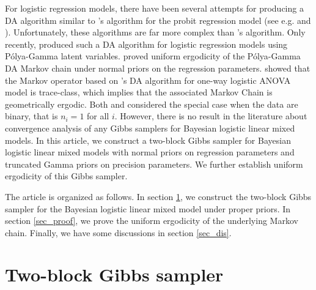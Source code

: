 \documentclass[11pt,a4paper]{article}
\newcommand{\pcite}[1]{\citeauthor{#1}'s \citeyearpar{#1}}
\begin{document}
For logistic regression models, there have been several attempts for producing a DA algorithm similar to \pcite{albert1993bayesian} algorithm for the probit regression model (see e.g. \cite{holmes2006bayesian} and \cite{fruhwirth2010data}). Unfortunately, these algorithms are far more complex than \pcite{albert1993bayesian} algorithm. Only recently, \cite{polson2013bayesian} produced such a DA algorithm for logistic regression models using P\'olya-Gamma latent variables. \cite{choi2013polya} proved uniform ergodicity of the P\'olya-Gamma  DA Markov chain under normal priors on the regression parameters. \cite{choi2017analysis} showed that the Markov operator based on \pcite{polson2013bayesian} DA algorithm for one-way logistic ANOVA model is trace-class, which implies that the associated Markov Chain is geometrically ergodic. Both \cite{choi2013polya} and \cite{choi2017analysis} considered the special case when the data are binary, that is $n_i = 1$ for all $i$. However, there is no result in the literature about convergence analysis of any Gibbs samplers for Bayesian logistic linear mixed models. In this article, we construct a two-block Gibbs sampler for Bayesian logistic linear mixed models with normal priors on regression parameters and truncated Gamma priors on precision parameters.  We further establish uniform ergodicity of this Gibbs sampler. %

The article is organized as follows. In section \ref{sec_gibbs}, we
construct the two-block Gibbs sampler for the Bayesian logistic linear
mixed model under proper priors. In section \ref{sec_proof}, we prove the uniform ergodicity of the underlying Markov chain. Finally, we have some discussions in section \ref{sec_dis}.


\section{Two-block Gibbs sampler}
\label{sec_gibbs}

\end{document}
